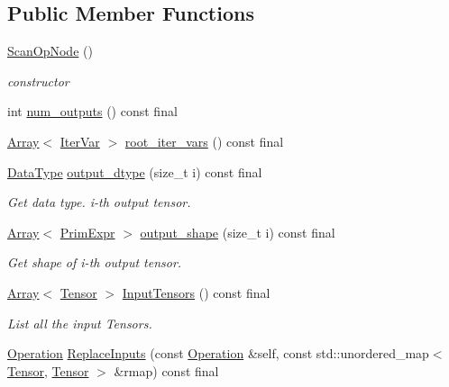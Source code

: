 \subsection*{Public Member Functions}
\begin{DoxyCompactItemize}
\item 
\hyperlink{classtvm_1_1te_1_1ScanOpNode_a1b681295f74cb94732ef167a15a8488f}{Scan\+Op\+Node} ()
\begin{DoxyCompactList}\small\item\em constructor \end{DoxyCompactList}\item 
int \hyperlink{classtvm_1_1te_1_1ScanOpNode_a1c3059f01aa644a41a6fbfec16538d1e}{num\+\_\+outputs} () const final
\item 
\hyperlink{classtvm_1_1Array}{Array}$<$ \hyperlink{classtvm_1_1tir_1_1IterVar}{Iter\+Var} $>$ \hyperlink{classtvm_1_1te_1_1ScanOpNode_a7a2670bdbf28281b2a8d977e43bc0add}{root\+\_\+iter\+\_\+vars} () const final
\item 
\hyperlink{namespacetvm_a41918af1a1dc386388639a9d3ad06c5d}{Data\+Type} \hyperlink{classtvm_1_1te_1_1ScanOpNode_a397b086940fe3115acdb83c3ce61a0cc}{output\+\_\+dtype} (size\+\_\+t i) const final
\begin{DoxyCompactList}\small\item\em Get data type. i-\/th output tensor. \end{DoxyCompactList}\item 
\hyperlink{classtvm_1_1Array}{Array}$<$ \hyperlink{classtvm_1_1PrimExpr}{Prim\+Expr} $>$ \hyperlink{classtvm_1_1te_1_1ScanOpNode_af7070bd5acff34504792421f2abab32c}{output\+\_\+shape} (size\+\_\+t i) const final
\begin{DoxyCompactList}\small\item\em Get shape of i-\/th output tensor. \end{DoxyCompactList}\item 
\hyperlink{classtvm_1_1Array}{Array}$<$ \hyperlink{classtvm_1_1te_1_1Tensor}{Tensor} $>$ \hyperlink{classtvm_1_1te_1_1ScanOpNode_ac204a6af379204229fc74a7aadc988a9}{Input\+Tensors} () const final
\begin{DoxyCompactList}\small\item\em List all the input Tensors. \end{DoxyCompactList}\item 
\hyperlink{classtvm_1_1te_1_1Operation}{Operation} \hyperlink{classtvm_1_1te_1_1ScanOpNode_aca04ce0320a08cbec1c71c30c968c9ab}{Replace\+Inputs} (const \hyperlink{classtvm_1_1te_1_1Operation}{Operation} \&self, const std\+::unordered\+\_\+map$<$ \hyperlink{classtvm_1_1te_1_1Tensor}{Tensor}, \hyperlink{classtvm_1_1te_1_1Tensor}{Tensor} $>$ \&rmap) const final

\end{DoxyCompactItemize}

